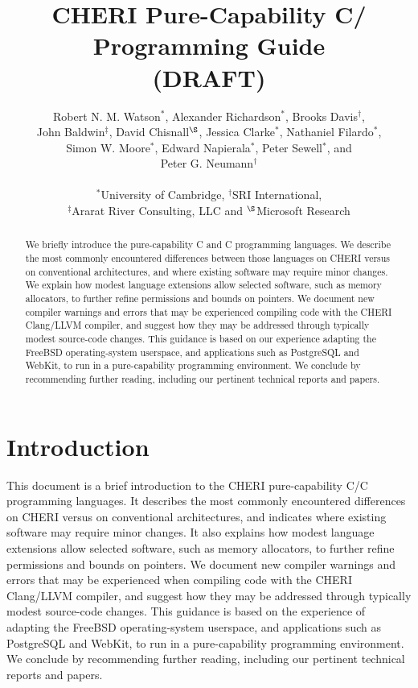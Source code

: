 \documentclass[12pt,twoside,openright,usletter]{article}
\title{CHERI Pure-Capability C/\cppInHeader{} Programming Guide \\ (DRAFT)}
\author{Robert N. M. Watson$^*$, Alexander Richardson$^*$,
  Brooks Davis$^\dagger$, \\
  John Baldwin$^\ddagger$, David Chisnall$^\S$, Jessica Clarke$^*$,
  Nathaniel Filardo$^*$, \\
  Simon W. Moore$^*$,  Edward Napierala$^*$, Peter Sewell$^*$, and \\
  Peter G. Neumann$^\dagger$ \\
  \\
  $^*$University of Cambridge, $^\dagger$SRI International, \\
  $^\ddagger$Ararat River Consulting, LLC and $^\S$Microsoft Research}
\newcommand{\note}[2]{{\color{blue}[ Note: #1 - #2]}}
\renewcommand{\note}[2]{\relax\ifhmode\unskip\fi}
\newcommand{\psnote}[1]{\note{#1}{Peter S.}}
\newcommand*{\cpp}[1][]{C\textsmaller[2]{\nolinebreak[4]\hspace{-.05em}\raisebox{.45ex}{\textbf{++}}}}
\newcommand*{\purecapCOrCpp}[1]{CHERI pure-capability C/\cpp{}}
\begin{document}
\sloppy

\maketitle


%
%
\begin{abstract}
We briefly introduce the pure-capability C and \cpp{} programming languages.
We describe the most commonly encountered differences between
%
those languages on CHERI versus on conventional architectures,
\psnote{that reads as ``differences between C and C++''.  Suggest:
  these CHERI dialects and conventional-architecture C and C++,
  }
and where existing software may
require minor changes.
We explain how modest language extensions allow selected software, such
as memory allocators, to further refine permissions and bounds on pointers.
We document new compiler warnings and errors that may be experienced compiling
code with the CHERI Clang/LLVM compiler, and suggest how they may be addressed
through typically modest source-code changes.
This guidance is based on our experience adapting the FreeBSD operating-system
userspace, and applications such as PostgreSQL and WebKit, to run in a
pure-capability programming environment.
We conclude by recommending further reading, including our pertinent technical
reports and papers.
\end{abstract}

\newpage
\setcounter{tocdepth}{2}
\tableofcontents

\newpage

\section{Introduction}

%
%
This document is a brief introduction to the \purecapCOrCpp{}
programming languages.
It describes the most commonly encountered differences
on CHERI versus on conventional architectures,
\psnote{same here: that reads as ``differences between C and C++''.  Suggest:
  these CHERI dialects and conventional-architecture C and C++,
  }
and
indicates
where existing software may require minor changes.
It also explains how modest language extensions allow selected software, such
as memory allocators, to further refine permissions and bounds on pointers.
We document new compiler warnings and errors that may be experienced
when compiling
code with the CHERI Clang/LLVM compiler, and suggest how they may be addressed
through typically modest source-code changes.
This guidance is based on the experience of adapting the FreeBSD
operating-system userspace, and applications such as PostgreSQL and WebKit, to
run in a pure-capability programming environment.
We conclude by recommending further reading, including our pertinent technical
reports and papers.
\end{document}
